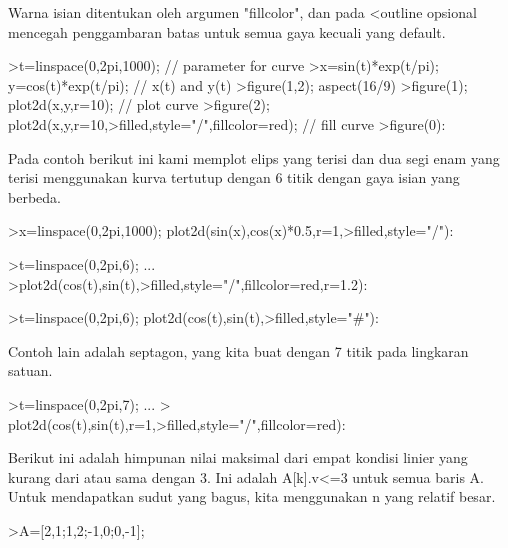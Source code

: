 \documentclass[a4paper,10pt]{article}
\begin{document}
\begin{eulernotebook}
\begin{eulercomment}
\begin{eulercomment}
\begin{eulercomment}
\begin{eulercomment}
\begin{eulercomment}
\begin{eulercomment}
\begin{eulercomment}
\begin{eulercomment}
\begin{eulercomment}
\begin{eulercomment}
\begin{eulercomment}
Warna isian ditentukan oleh argumen "fillcolor", dan pada \textless{}outline
opsional mencegah penggambaran batas untuk semua gaya kecuali yang
default. 
\end{eulercomment}
\begin{eulerprompt}
>t=linspace(0,2pi,1000); // parameter for curve
>x=sin(t)*exp(t/pi); y=cos(t)*exp(t/pi); // x(t) and y(t)
>figure(1,2); aspect(16/9)
>figure(1); plot2d(x,y,r=10); // plot curve
>figure(2); plot2d(x,y,r=10,>filled,style="/",fillcolor=red); // fill curve
>figure(0):
\end{eulerprompt}
\begin{eulercomment}
Pada contoh berikut ini kami memplot elips yang terisi dan dua segi
enam yang terisi menggunakan kurva tertutup dengan 6 titik dengan gaya
isian yang berbeda.
\end{eulercomment}
\begin{eulerprompt}
>x=linspace(0,2pi,1000); plot2d(sin(x),cos(x)*0.5,r=1,>filled,style="/"):
\end{eulerprompt}
\begin{eulerprompt}
>t=linspace(0,2pi,6); ...
>plot2d(cos(t),sin(t),>filled,style="/",fillcolor=red,r=1.2):
\end{eulerprompt}
\begin{eulerprompt}
>t=linspace(0,2pi,6); plot2d(cos(t),sin(t),>filled,style="#"):
\end{eulerprompt}
\begin{eulercomment}
Contoh lain adalah septagon, yang kita buat dengan 7 titik pada
lingkaran satuan.
\end{eulercomment}
\begin{eulerprompt}
>t=linspace(0,2pi,7);  ...
> plot2d(cos(t),sin(t),r=1,>filled,style="/",fillcolor=red):
\end{eulerprompt}
\begin{eulercomment}
Berikut ini adalah himpunan nilai maksimal dari empat kondisi linier
yang kurang dari atau sama dengan 3. Ini adalah A[k].v\textless{}=3 untuk semua
baris A. Untuk mendapatkan sudut yang bagus, kita menggunakan n yang
relatif besar.
\end{eulercomment}
\begin{eulerprompt}
>A=[2,1;1,2;-1,0;0,-1];

\end{eulerprompt}
\end{eulercomment}
\end{eulercomment}
\end{eulercomment}
\end{eulercomment}
\end{eulercomment}
\end{eulercomment}
\end{eulercomment}
\end{eulercomment}
\end{eulercomment}
\end{eulercomment}
\end{eulernotebook}
\end{document}
